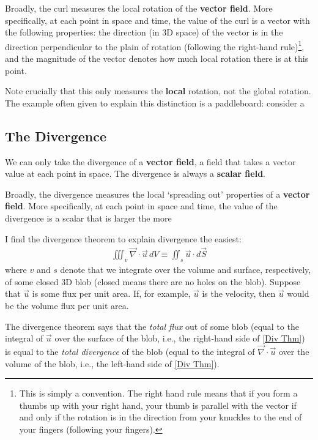 Broadly, the curl measures the local rotation of the \textbf{vector field}. More specifically, at each point in space and time, the value of the curl is a vector with the following properties: the direction (in 3D space) of the vector is in the direction perpendicular to the plain of rotation (following the right-hand rule)\footnote{This is simply a convention. The right hand rule means that if you form a thumbs up with your right hand, your thumb is parallel with the vector if and only if the rotation is in the direction from your knuckles to the end of your fingers (following your fingers).}, and the magnitude of the vector denotes how much local rotation there is at this point.

Note crucially that this only measures the \textbf{local} rotation, not the global rotation. The example often given to explain this distinction is a paddleboard: consider a 

\subsection{The Divergence}

We can only take the divergence of a \textbf{vector field}, a field that takes a vector value at each point in space. The divergence is always a \textbf{scalar field}.

Broadly, the divergence measures the local `spreading out' properties of a \textbf{vector field}. More specifically, at each point in space and time, the value of the divergence is a scalar that is larger the more 

I find the divergence theorem to explain divergence the easiest:
\begin{align}
    \label{Div Thm}
    \iiint_v \vec{\nabla}\cdot \vec{u} \,dV \equiv \iint_s \vec{u}\cdot d\vec{S}
\end{align}
where $v$ and $s$ denote that we integrate over the volume and surface, respectively, of some closed 3D blob (closed means there are no holes on the blob). Suppose that $\vec{u}$ is some flux per unit area. If, for example, $\vec{u}$ is the velocity, then $\vec{u}$ would be the volume flux per unit area. 

The divergence theorem says that the \textit{total flux} out of some blob (equal to the integral of $\vec{u}$ over the surface of the blob, i.e., the right-hand side of \ref{Div Thm}) is equal to the \textit{total divergence} of the blob (equal to the integral of $\vec{\nabla}\cdot\vec{u}$ over the volume of the blob, i.e., the left-hand side of \ref{Div Thm}). 

